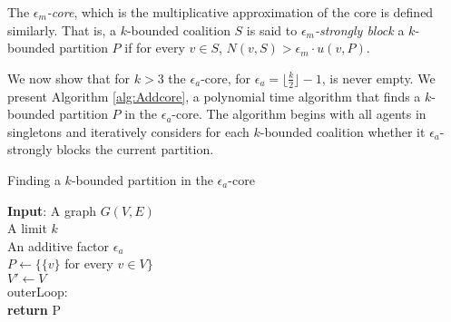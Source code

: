 \documentclass[sigconf,anonymous]{aamas}
\begin{document}
The \emph{$\epsilon_m$-core}, which is the multiplicative approximation of the core is defined similarly. That is, a $k$-bounded coalition $S$ is said to \emph{$\epsilon_m$-strongly block} a $k$-bounded partition $P$ if for every $v \in S$, $N(v,S) > \epsilon_m \cdot u(v,P)$.




We now show that for $k>3$ the $\epsilon_a$-core, for $\epsilon_a = \lfloor \frac{k}{2} \rfloor -1$, is never empty. We present Algorithm \ref{alg:Addcore}, a polynomial time algorithm that finds a $k$-bounded partition $P$ in the $\epsilon_a$-core. The algorithm begins with all agents in singletons and iteratively considers for each $k$-bounded coalition whether it $\epsilon_a$-strongly blocks the current partition.

\begin{algorithm}[ht]
    \caption{Finding a $k$-bounded partition in the $\epsilon_a$-core}
    \label{alg:Addcore}
    \SetAlgoLined
    \textbf{Input}:
    A graph $G(V,E)$\\
    A limit $k$\\
    An additive factor $\epsilon_a$\\
    $P \leftarrow \{\{v\}$ for every $v \in V\}$\\
    $V' \leftarrow V$\\
    outerLoop:\\ 
    \label{Addcore:outerLoop}
        \textbf{return} P
\end{algorithm}
\end{document}
